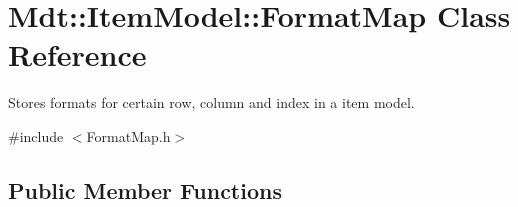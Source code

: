 \hypertarget{class_mdt_1_1_item_model_1_1_format_map}{}\section{Mdt\+:\+:Item\+Model\+:\+:Format\+Map Class Reference}
\label{class_mdt_1_1_item_model_1_1_format_map}


Stores formats for certain row, column and index in a item model.  




{\ttfamily \#include $<$Format\+Map.\+h$>$}

\subsection*{Public Member Functions}
